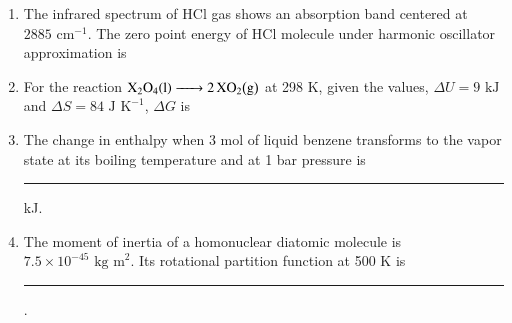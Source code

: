 \documentclass[journal,12pt,onecolumn]{IEEEtran}
\theoremstyle{remark}
\begin{document}
\begin{enumerate}
\item The infrared spectrum of HCl gas shows an absorption band centered at $2885\text{ cm}^{-1}$. The zero point energy of HCl molecule under harmonic oscillator approximation is
    \begin{enumerate}
        \hfill{}
    \end{enumerate}



\item For the reaction $\ce{X2O4\brak{l} -> 2XO2\brak{g}}$ at 298 K, given the values, $\Delta U=9\text{ kJ}$ and $\Delta S=84\text{ J K}^{-1}$, $\Delta G$ is
    \begin{enumerate}
        \hfill{}
    \end{enumerate}



\item The change in enthalpy when 3 mol of liquid benzene transforms to the vapor state at its boiling temperature  and at 1 bar pressure is \rule{1cm}{0.15mm} kJ.
\hfill{}



\item The moment of inertia of a homonuclear diatomic molecule is $7.5\times10^{-45}\text{ kg m}^{2}$. Its rotational partition function at 500 K is \rule{1cm}{0.15mm}.
\hfill{}




\end{enumerate}
\end{document}
